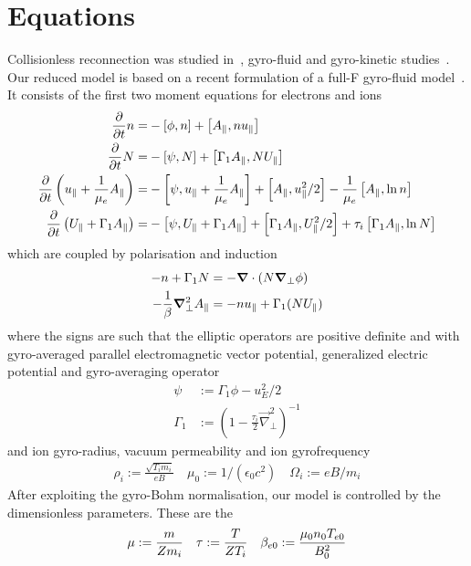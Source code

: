 \section{Equations}
Collisionless reconnection was studied in~\cite{Stanier2015}, gyro-fluid and gyro-kinetic studies~\cite{Comisso2013,Zacharias2014}.
Our reduced model is based on a recent formulation of a full-F gyro-fluid model~\cite{Madsen2013}.
It consists of the first two moment equations for electrons and ions
\begin{align}
\frac{\partial}{\partial t} \ne =&
 - \left[\phi, \ne\right]
+ \left[\Apar,\ne \ue  \right]
\\
\label{firstgyromom}
\frac{\partial}{\partial t} \Ni =&
 - \left[\psi, \Ni\right]
+ \left[\Gamma_1 \Apar ,\Ni \Ui  \right]
 \\
\frac{\partial}{\partial t} \left( \ue+ \frac{1}{\mu_e} \Apar \right) =&
      -  \left[ \psi, \ue+ \frac{1}{\mu_e} \Apar  \right]%
    +   \left[\Apar,\ue^2/2   \right]%
      - \frac{1}{\mu_e}  \left[\Apar,\ln{\ne}   \right]
      \\
      \frac{\partial}{\partial t} \left( \Ui+ \Gamma_1 \Apar  \right) =&
      -  \left[ \psi, \Ui+ \Gamma_1 \Apar  \right]%
     +   \left[\Gamma_1 \Apar,\Ui^2/2   \right]%
      + \tau_i  \left[\Gamma_1 \Apar,\ln{\Ni}   \right]
\end{align}
which are coupled by polarisation and induction
\begin{align}
 -n  + \Gamma_1 N &= -{\boldsymbol{\nabla}}\cdot\left(N {\boldsymbol{\nabla}}_\perp \phi\right) \\
 -\frac{1}{\beta} {\boldsymbol{\nabla}}_\perp^2 A_\parallel &=  -n  u_\parallel + \Gamma_1 (N U_\parallel)
\end{align}
where the signs are such that the elliptic operators are positive definite and
with gyro-averaged parallel electromagnetic vector potential, generalized electric potential and gyro-averaging operator
\begin{align}
 \psi &:= \Gamma_1 \phi - u_E^2 /2  \\
  \Gamma_1 &:= (1-\frac{\tau_i}{2} \vec{\nabla}_\perp^2 )^{-1}
\end{align}
and ion gyro-radius, vacuum permeability and ion gyrofrequency
\begin{align}
  \rho_{i}   := \frac{\sqrt{T_{i} m_i}}{e B} \quad
  \mu_0 := 1/(\epsilon_0 c^2) \quad
  \Omega_i := e B / m_i
\end{align}
After exploiting the gyro-Bohm normalisation, our model is controlled by the dimensionless parameters. These
are the
\begin{align}
 \mu   :=  \frac{m}{Z m_i} \quad
 \tau  :=  \frac{T}{ Z T_i}\quad
 \beta_{e0} :=  \frac{\mu_0 n_0 T_{e0} }{ B_0^2 }
\end{align}


